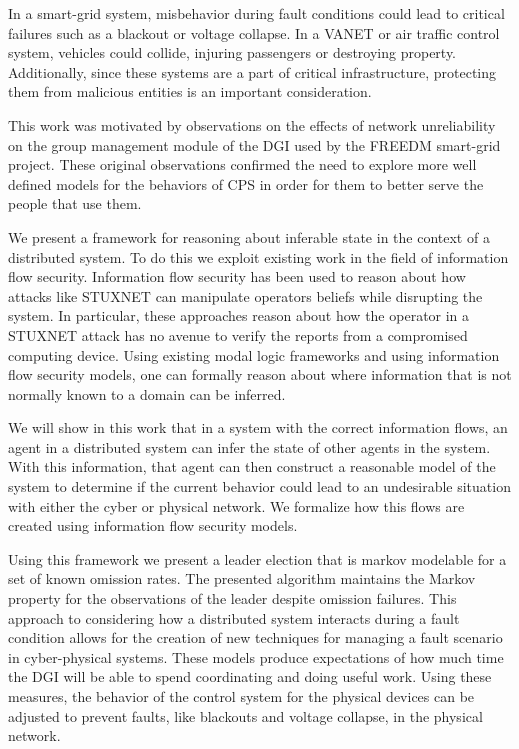 In a smart-grid system, misbehavior during fault conditions could lead to critical failures such as a blackout or voltage collapse. In a \ac{VANET} or air traffic control system, vehicles could collide, injuring passengers or destroying property. Additionally, since these systems are a part of critical infrastructure, protecting them from malicious entities is an important consideration.

This work was motivated by observations on the effects of network unreliability on the group management module of the \ac{DGI} used by the \ac{FREEDM} smart-grid project.
These original observations confirmed the need to explore more well defined models for the behaviors of \ac{CPS} in order for them to better serve the people that use them.

We present a framework for reasoning about inferable state in the context of a distributed system. To do this we exploit existing work in the field of information flow security. Information flow security has been used to reason about how attacks like STUXNET can manipulate operators beliefs while disrupting the system\cite{STUXNET}. In particular, these approaches reason about how the operator in a STUXNET attack has no avenue to verify the reports from a compromised computing device. Using existing modal logic frameworks and using information flow security models\cite{Howser2012}\cite{STUXNET}\cite{Howser2013}, one can formally reason about where information that is not normally known to a domain can be inferred.

We will show in this work that in a system with the correct information flows, an agent in a distributed system can infer the state of other agents in the system. With this information, that agent can then construct a reasonable model of the system to determine if the current behavior could lead to an undesirable situation with either the cyber or physical network. We formalize how this flows are created using information flow security models.

Using this framework we present a leader election that is markov modelable for a set of known omission rates.
The presented algorithm maintains the Markov property for the observations of the leader despite omission\cite{OMISSIONFAILURES} failures.
This approach to considering how a distributed system interacts during a fault condition allows for the creation of new techniques for managing a fault scenario in cyber-physical systems.
These models produce expectations of how much time the DGI will be able to spend coordinating and doing useful work.
Using these measures, the behavior of the control system for the physical devices can be adjusted to prevent faults, like blackouts and voltage collapse, in the physical network.

